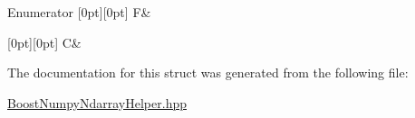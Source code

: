 \begin{DoxyEnumFields}{Enumerator}
[0pt][0pt]{}\mbox{\label{struct_num_c_1_1_order_aec83b68303911af9c219019600b56f23a32b2f0387d67915464434381e2488911}} 
F&\\
\hline

[0pt][0pt]{}\mbox{\label{struct_num_c_1_1_order_aec83b68303911af9c219019600b56f23af139755e58933d7edd13e52a9603ee6c}} 
C&\\
\hline

\end{DoxyEnumFields}


The documentation for this struct was generated from the following file\+:\begin{DoxyCompactItemize}
\item 
\mbox{\hyperlink{_boost_numpy_ndarray_helper_8hpp}{Boost\+Numpy\+Ndarray\+Helper.\+hpp}}\end{DoxyCompactItemize}

